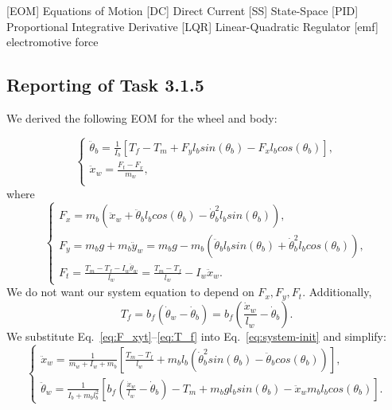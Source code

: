 \documentclass[11pt]{article} %
\begin{document}
\begin{acronym}[TDMA]
		[EOM]	{Equations of Motion}
		[DC]	{Direct Current}
		[SS]	{State-Space}
		[PID]	{Proportional Integrative Derivative}
		[LQR]	{Linear-Quadratic Regulator}
		[emf]	{electromotive force}
\end{acronym}

\subsection*{Reporting of Task 3.1.5}
We derived the following \ac{EOM} for the wheel and body:

\begin{equation}\label{eq:system-init}
  \begin{cases}
    \ddot{\theta}_b =
    \frac{1}{I_b}\left[
      T_f
      - T_m
      + F_y l_b sin(\theta_b)
      - F_x l_b cos(\theta_b)
    \right], \\[1em]
    \ddot{x}_w = \frac{F_t - F_x}{m_w}, \\
  \end{cases}
\end{equation}
where
\begin{equation}\label{eq:F_xyt}
  \begin{cases}
    F_x = m_b\left(
      \ddot{x}_w
      + \ddot{\theta}_b l_b cos(\theta_b)
      - \dot{\theta}^2_b l_b sin(\theta_b)
    \right), \\[1em]
    F_y = m_b g+ m_b \ddot{y}_w = m_b g - m_b\left(
      \ddot{\theta}_b l_b sin(\theta_b)
      + \dot{\theta}^2_b l_b cos(\theta_b)
    \right), \\[1em]
    F_t = \frac{T_m - T_f - I_w \ddot{\theta}_w}{l_w} = \frac{T_m - T_f}{l_w} - I_w \ddot{x}_w.
  \end{cases}
\end{equation}
We do not want our system equation to depend on $F_x, F_y, F_t$.
Additionally,
\begin{equation}\label{eq:T_f}
T_f = b_f\left(
\dot{\theta}_w - \dot{\theta}_b
\right) =
b_f\left(
\frac{\dot{x}_w}{l_w} - \dot{\theta}_b
\right).
\end{equation}
We substitute Eq.~\eqref{eq:F_xyt}--\eqref{eq:T_f} into Eq.~\eqref{eq:system-init} and simplify:
\begin{equation}\label{eq:system}
  \begin{cases}
    \ddot{x}_w = \frac{1}{m_w + I_w + m_b}\left[
      \frac{T_m - T_f}{l_w}
      + m_b l_b \left(\dot{\theta}^2_b sin(\theta_b)
        - \ddot{\theta}_b cos(\theta_b)
      \right)
    \right], \\[1em]
    \ddot{\theta}_w = \frac{1}{I_b + m_b l_b^2}\left[
      b_f\left(\frac{\dot{x}_w}{l_w}
        - \dot{\theta}_b\right)
      - T_m
      + m_b g l_b sin(\theta_b)
      - \ddot{x}_w m_b l_b cos(\theta_b)
    \right].
  \end{cases}
\end{equation}
\end{document}
